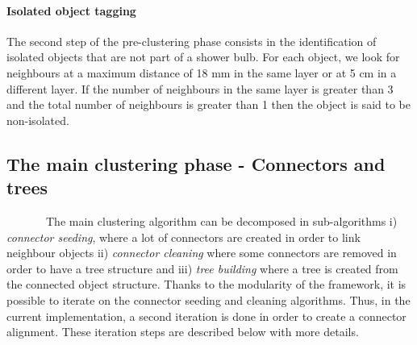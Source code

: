 \documentclass[cits]{JINST}
\begin{document}
\paragraph*{Isolated object tagging} The second step of the pre-clustering phase consists in the identification of isolated objects that are not part of a shower bulb. For each object, we look for neighbours at a maximum distance of 18 mm in the same layer or at 5 cm in a different layer. If the number of neighbours in the same layer is greater than 3 and the total number of neighbours is greater than 1 then the object is said to be non-isolated.

\subsection{The main clustering phase - Connectors and trees}

~~~~~~~The main clustering algorithm can be decomposed in sub-algorithms i) \textit{connector seeding}, where a lot of connectors are created in order to link neighbour objects ii) \textit{connector cleaning} where some connectors are removed in order to have a tree structure and iii) \textit{tree building} where a tree is created from the connected object structure. Thanks to the modularity of the framework, it is possible to iterate on the connector seeding and cleaning algorithms. Thus, in the current implementation, a second iteration is done in order to create a connector alignment. These iteration steps are described below with more details. \\
\end{document}
